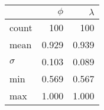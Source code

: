 \begin{tabular}{lrr}
\toprule
         & $\phi$ &  $\lambda$   \\
\midrule
count    &  100   &  100 \\
mean     &  0.929 &  0.939 \\
$\sigma$ &  0.103 &  0.089 \\
min      &  0.569 &  0.567 \\
max      &  1.000 &  1.000 \\
\bottomrule
\end{tabular}